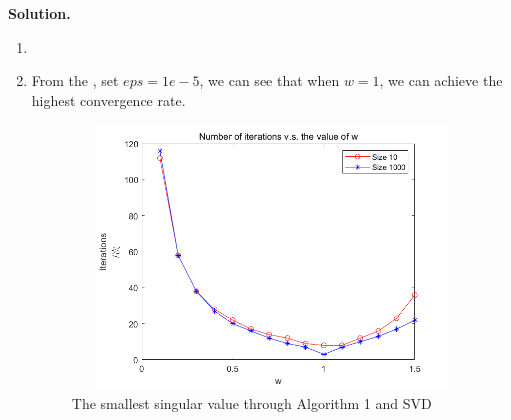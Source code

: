 \documentclass[english,onecolumn]{IEEEtran}
\begin{document}
\noindent
\textbf{Solution.}
\begin{enumerate}
	\item
	
	\item From the , set $eps = 1e-5$, we can see that when $w=1$, we can achieve the highest convergence rate.
	\begin{figure}[h]
		\centering
		\includegraphics[height=7cm,width=11cm]{pro3_2.png}
		\caption{The smallest singular value through Algorithm 1 and SVD}
		\label{2}
	\end{figure}



\end{enumerate}
\end{document}
